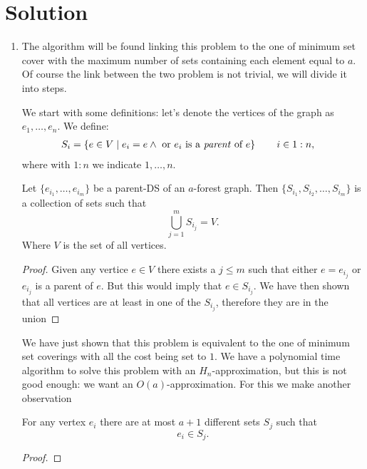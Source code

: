 \documentclass[11pt]{article}
\begin{document}
\section*{Solution}
\begin{enumerate}
    \item\label{p:1} The algorithm will be found linking this problem to the one of minimum set cover with the maximum number of sets containing each element equal to $a$. Of course the link between the two problem is not trivial, we will divide it into steps. 
    
    We start with some definitions: let's denote the vertices of the graph as $e_1,\dots,e_n$. We define:
    \begin{align*}
        S_{i} &= \left\{e \in V \mid e_i = e \land \text{ or $e_i$ is a \textit{parent} of }e \right\}\qquad i \in 1:n,
    \end{align*}
    where with $1:n$ we indicate $1,\dots,n$. 
    \begin{observation} Let $\{e_{i_1},\dots, e_{i_m}\}$ be a parent-DS of an $a$-forest graph. Then $\{S_{i_1}, S_{i_{2}}, \dots, S_{i_{m}}\}$ is a collection of sets such that
        \begin{equation*}
            \bigcup_{j=1}^mS_{i_j} = V.
        \end{equation*}
    Where $V$ is the set of all vertices.
    \end{observation}
    \begin{proof}
        Given any vertice $e\in V$ there exists a $j\leq m$ such that either $e = e_{i_j}$ or $e_{i_j}$ is a parent of $e$. But this would imply that $e \in S_{i_j}$. We have then shown that all vertices are at least in one of the $S_{i_j}$, therefore they are in the union
    \end{proof}
    We have just shown that this problem is equivalent to the one of minimum set coverings with all the cost being set to $1$. We have a polynomial time algorithm to solve this problem with an $H_n$-approximation, but this is not good enough: we want an $O(a)$-approximation. For this we make another observation
    \begin{observation} For any vertex $e_i$ there are at most $a+1$ different sets $S_j$ such that 
        \begin{equation*}
            e_i \in S_j.
        \end{equation*}
    \end{observation}
    \begin{proof}

\end{proof}
\end{enumerate}
\end{document}

